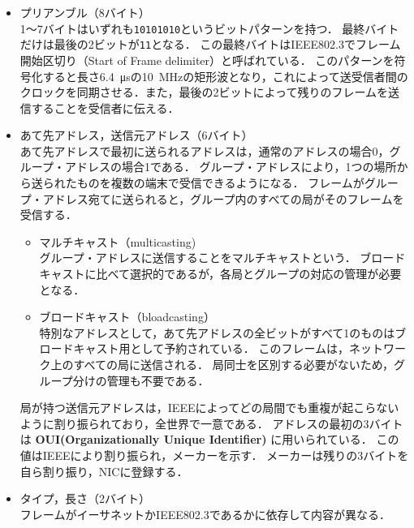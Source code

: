 \documentclass[a4paper]{ltjsarticle}
\begin{document}
\begin{itemize}
\item
  プリアンブル（8バイト）\\
  1〜7バイトはいずれも\texttt{10101010}というビットパターンを持つ．
  最終バイトだけは最後の2ビットが\texttt{11}となる．
  この最終バイトはIEEE802.3でフレーム開始区切り（Start of Frame
  delimiter）と呼ばれている．
  このパターンを符号化すると長さ\SI{6.4}{\micro s}の\SI{10}{MHz}の矩形波となり，これによって送受信者間のクロックを同期させる．また，最後の2ビットによって残りのフレームを送信することを受信者に伝える．
\item
  あて先アドレス，送信元アドレス（6バイト）\\
  あて先アドレスで最初に送られるアドレスは，通常のアドレスの場合0，グループ・アドレスの場合1である．
  グループ・アドレスにより，1つの場所から送られたものを複数の端末で受信できるようになる．
  フレームがグループ・アドレス宛てに送られると，グループ内のすべての局がそのフレームを受信する．

  \begin{itemize}
  \item
    マルチキャスト（multicasting)\\
    グループ・アドレスに送信することをマルチキャストという．
    ブロードキャストに比べて選択的であるが，各局とグループの対応の管理が必要となる．
  \item
    ブロードキャスト（bloadcasting）\\
    特別なアドレスとして，あて先アドレスの全ビットがすべて1のものはブロードキャスト用として予約されている．
    このフレームは，ネットワーク上のすべての局に送信される．
    局同士を区別する必要がないため，グループ分けの管理も不要である．
  \end{itemize}

  局が持つ送信元アドレスは，IEEEによってどの局間でも重複が起こらないように割り振られており，全世界で一意である．
  アドレスの最初の3バイトは \textbf{OUI(Organizationally Unique
  Identifier)} に用いられている．
  この値はIEEEにより割り振られ，メーカーを示す．
  メーカーは残りの3バイトを自ら割り振り，NICに登録する．
\item
  タイプ，長さ（2バイト）\\
  フレームがイーサネットかIEEE802.3であるかに依存して内容が異なる．


\end{itemize}
\end{document}
